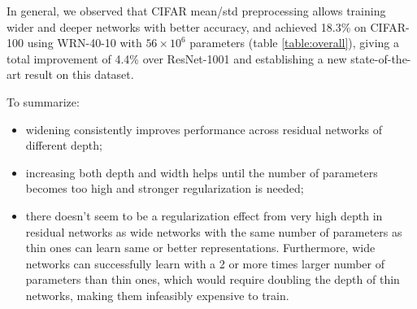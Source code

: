 \documentclass{bmvc2k}
\begin{document}
In general,  we  observed that CIFAR mean/std preprocessing  allows training wider and deeper networks with better accuracy, and achieved 18.3\% on CIFAR-100 using WRN-40-10 with $56\times10^6$ parameters (table \ref{table:overall}), giving a total improvement of 4.4\% over ResNet-1001 and establishing a new state-of-the-art result on this dataset.


To summarize:
\begin{itemize}
  \item{widening consistently improves performance across residual networks of different depth;}
  \item{increasing both depth and width helps until the number of parameters becomes too high and stronger regularization is needed;}
  \item{there doesn't seem to be a regularization effect from very high depth in residual networks as wide networks with the same number of parameters as thin ones can learn same or better representations. Furthermore, wide networks can successfully learn with a 2 or more times larger number of parameters than thin ones, which would require doubling the depth of thin networks, making them infeasibly expensive to train.}
\end{itemize}
\end{document}
